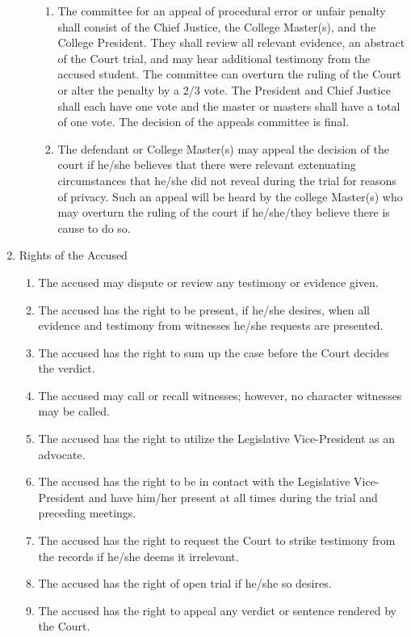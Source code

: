 \documentclass[11pt]{amsart}
\begin{document}
\begin{enumerate}
\begin{enumerate}
\begin{enumerate}
		\item The committee for an appeal of procedural error or unfair penalty shall consist of the Chief Justice, the College Master(s), and the College President. They shall review all relevant evidence, an abstract of the Court trial, and may hear additional testimony from the accused student. The committee can overturn the ruling of the Court or alter the penalty by a 2/3 vote. The President and Chief Justice shall each have one vote and the master or masters shall have a total of one vote. The decision of the appeals committee is final.
		\item The defendant or College Master(s) may appeal the decision of the court if he/she believes that there were relevant extenuating circumstances that he/she did not reveal during the trial for reasons of privacy. Such an appeal will be heard by the college Master(s) who may overturn the ruling of the court if he/she/they believe there is cause to do so.
			\end{enumerate}

	\end{enumerate}
\item Rights of the Accused
	\begin{enumerate}
	\item The accused may dispute or review any testimony or evidence given.
	\item The accused has the right to be present, if he/she desires, when all evidence and testimony from witnesses he/she requests are presented.
	\item The accused has the right to sum up the case before the Court decides the verdict.
	\item The accused may call or recall witnesses; however, no character witnesses may be called.
	\item The accused has the right to utilize the Legislative Vice-President as an advocate.
	\item The accused has the right to be in contact with the Legislative Vice-President and have him/her present at all times during the trial and preceding meetings.
	\item The accused has the right to request the Court to strike testimony from the records if he/she deems it irrelevant.
	\item The accused has the right of open trial if he/she so desires.
	\item The accused has the right to appeal any verdict or sentence rendered by the Court.
	\end{enumerate}
	
	\end{enumerate}
\end{document}
